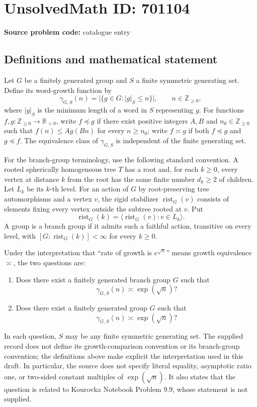 \documentclass[11pt]{article}
\newcommand{\Z}{\mathbb{Z}}
\newcommand{\R}{\mathbb{R}}
\begin{document}
\section*{UnsolvedMath ID: 701104}
\textbf{Source problem code:} catalogue entry
\subsection{Definitions and mathematical statement}
Let \(G\) be a finitely generated group and \(S\) a finite symmetric generating set. Define its word-growth function by
\[
\gamma_{G,S}(n)=\bigl|\{g\in G:\lvert g\rvert_S\le n\}\bigr|,\qquad n\in\Z_{\ge0},
\]
where \(\lvert g\rvert_S\) is the minimum length of a word in \(S\) representing \(g\). For functions \(f,g:\Z_{\ge0}\to\R_{>0}\), write \(f\preccurlyeq g\) if there exist positive integers \(A,B\) and \(n_0\in\Z_{\ge0}\) such that \(f(n)\le A g(Bn)\) for every \(n\ge n_0\); write \(f\asymp g\) if both \(f\preccurlyeq g\) and \(g\preccurlyeq f\). The equivalence class of \(\gamma_{G,S}\) is independent of the finite generating set.

For the branch-group terminology, use the following standard convention. A rooted spherically homogeneous tree \(T\) has a root and, for each \(k\ge0\), every vertex at distance \(k\) from the root has the same finite number \(d_k\ge2\) of children. Let \(L_k\) be its \(k\)-th level. For an action of \(G\) by root-preserving tree automorphisms and a vertex \(v\), the rigid stabilizer \(\operatorname{rist}_G(v)\) consists of elements fixing every vertex outside the subtree rooted at \(v\). Put
\[
\operatorname{rist}_G(k)=\bigl\langle\operatorname{rist}_G(v):v\in L_k\bigr\rangle.
\]
A group is a branch group if it admits such a faithful action, transitive on every level, with \([G:\operatorname{rist}_G(k)]<\infty\) for every \(k\ge0\).

Under the interpretation that ``rate of growth is \(e^{\sqrt n}\)'' means growth equivalence \(\asymp\), the two questions are:
\begin{enumerate}
\item[(a)] Does there exist a finitely generated branch group \(G\) such that
\[
\gamma_{G,S}(n)\asymp \exp(\sqrt n)?
\]
\item[(b)] Does there exist a finitely generated group \(G\) such that
\[
\gamma_{G,S}(n)\asymp \exp(\sqrt n)?
\]
\end{enumerate}
In each question, \(S\) may be any finite symmetric generating set. The supplied record does not define its growth-comparison convention or its branch-group convention; the definitions above make explicit the interpretation used in this draft. In particular, the source does not specify literal equality, asymptotic ratio one, or two-sided constant multiples of \(\exp(\sqrt n)\). It also states that the question is related to Kourovka Notebook Problem 9.9, whose statement is not supplied.
\end{document}
